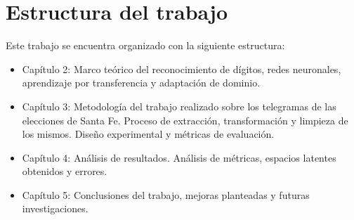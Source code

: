 \section{Estructura del trabajo}

Este trabajo se encuentra organizado con la siguiente estructura:

\begin{itemize}
    \item Capítulo 2: Marco teórico del reconocimiento de dígitos, redes neuronales, aprendizaje por transferencia y adaptación
          de dominio.
    \item Capítulo 3: Metodología del trabajo realizado sobre los telegramas de las elecciones de Santa Fe. Proceso de
          extracción, transformación y limpieza de los mismos. Diseño experimental y métricas de evaluación.
    \item Capítulo 4: Análisis de resultados. Análisis de métricas, espacios latentes obtenidos y errores.
    \item Capítulo 5: Conclusiones del trabajo, mejoras planteadas y futuras investigaciones.
\end{itemize}